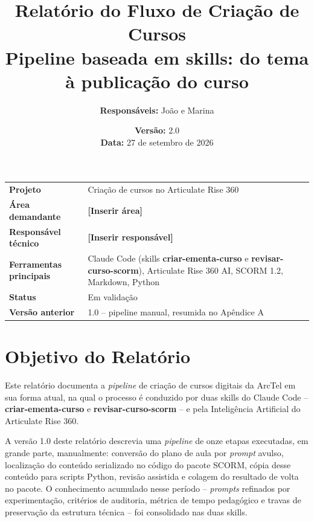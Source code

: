 \documentclass[12pt,a4paper]{article}
\title{\textbf{Relatório do Fluxo de Criação de Cursos}\\[4pt]
\large Pipeline baseada em skills: do tema à publicação do curso}
\author{\textbf{Responsáveis:} João e Marina}
\date{\textbf{Versão:} 2.0 \\ \textbf{Data:} 27 de setembro de 2026}
\newcommand{\skill}[1]{\textsf{\textbf{#1}}}
\newcommand{\pendente}[1]{\textcolor{vermelho}{\textbf{[#1]}}}
\begin{document}
\maketitle
\thispagestyle{empty}

\begin{center}
\vfill
\begin{tabular}{@{}L{0.30\textwidth}L{0.60\textwidth}@{}}
\toprule
\textbf{Projeto} & Criação de cursos no Articulate Rise 360 \\
\textbf{Área demandante} & \pendente{Inserir área} \\
\textbf{Responsável técnico} & \pendente{Inserir responsável} \\
\textbf{Ferramentas principais} & Claude Code (skills \skill{criar-ementa-curso} e \skill{revisar-curso-scorm}), Articulate Rise 360 AI, SCORM 1.2, Markdown, Python \\
\textbf{Status} & Em validação \\
\textbf{Versão anterior} & 1.0 -- pipeline manual, resumida no Apêndice A \\
\bottomrule
\end{tabular}
\vfill
\end{center}

\newpage
\tableofcontents
\newpage

\section{Objetivo do Relatório}

Este relatório documenta a \textit{pipeline} de criação de cursos digitais da ArcTel em sua forma atual, na qual o processo é conduzido por duas skills do Claude Code -- \skill{criar-ementa-curso} e \skill{revisar-curso-scorm} -- e pela Inteligência Artificial do Articulate Rise 360.

A versão 1.0 deste relatório descrevia uma \textit{pipeline} de onze etapas executadas, em grande parte, manualmente: conversão do plano de aula por \textit{prompt} avulso, localização do conteúdo serializado no código do pacote SCORM, cópia desse conteúdo para scripts Python, revisão assistida e colagem do resultado de volta no pacote. O conhecimento acumulado nesse período -- \textit{prompts} refinados por experimentação, critérios de auditoria, métrica de tempo pedagógico e travas de preservação da estrutura técnica -- foi consolidado nas duas skills.
\end{document}
